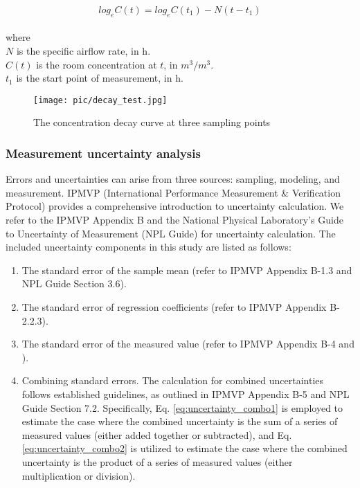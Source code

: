 \documentclass[3p,times,12pt]{elsarticle}
\begin{document}
\begin{sloppypar}
\begin{equation}
\label{eq:ach2}
log_{e}{C\left(t\right)} = log_{e}{C\left({t}_{1}\right)} - N\left(t-{t}_{1}\right)
\end{equation} \\
where \\
$N$ \qquad is the specific airflow rate, in h.\\
$C\left(t\right)$ \quad is the room concentration at $t$, in $m^3/m^3$. \\
${t}_{1}$ \qquad is the start point of measurement, in h. \\

\begin{figure}[H]
    \centering
    \texttt{[image: pic/decay\_test.jpg]}
    \caption{The concentration decay curve at three sampling points}
    \label{fig:decay}
\end{figure}

\subsubsection{Measurement uncertainty analysis}
\label{S:2.2.3}

Errors and uncertainties can arise from three sources: sampling, modeling, and measurement. IPMVP (International Performance Measurement \& Verification Protocol) \cite{IPMVP2012} provides a comprehensive introduction to uncertainty calculation. We refer to the IPMVP Appendix B \cite{IPMVP2012} and the National Physical Laboratory's Guide to Uncertainty of Measurement (NPL Guide) \cite{bell2001beginner} for uncertainty calculation. The included uncertainty components in this study are listed as follows:

\begin{enumerate}
    \item The standard error of the sample mean (refer to IPMVP Appendix B-1.3 and NPL Guide Section 3.6). 
    \item The standard error of regression coefficients (refer to IPMVP Appendix B-2.2.3).
    \item The standard error of the measured value (refer to IPMVP Appendix B-4 and \cite{taner2015optimisation}).
    \item Combining standard errors. The calculation for combined uncertainties follows established guidelines, as outlined in IPMVP Appendix B-5 and NPL Guide Section 7.2. Specifically, Eq. \ref{eq:uncertainty_combo1} is employed to estimate the case where the combined uncertainty is the sum of a series of measured values (either added together or subtracted), and Eq. \ref{eq:uncertainty_combo2} is utilized to estimate the case where the combined uncertainty is the product of a series of measured values (either multiplication or division).


\end{enumerate}
\end{sloppypar}
\end{document}
